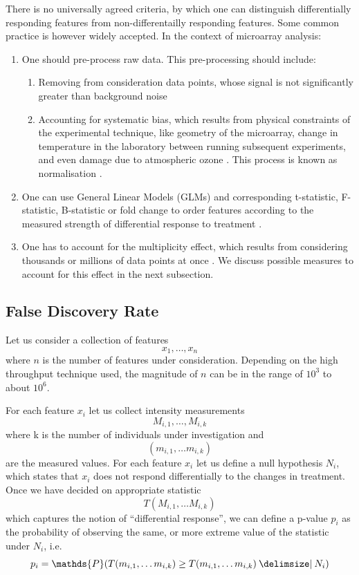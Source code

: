 There is no universally agreed criteria, by which one can distinguish differentially responding features from non-differentailly responding features. Some common practice is however widely accepted. In the context of microarray analysis:
\begin{enumerate}
    \item One should pre-process raw data. This pre-processing should include:
    \begin{enumerate}
        \item Removing from consideration data points, whose signal is not significantly greater than background noise \parencite{Smyth2004}
        \item Accounting for systematic bias, which results from physical constraints of the experimental technique, like geometry of the microarray, change in temperature in the laboratory between running subsequent experiments, and even damage due to atmospheric ozone \parencite{Fare2003}. This process is known as normalisation \parencite{Wit2004}.
    \end{enumerate}
    \item One can use General Linear Models (GLMs) and corresponding t-statistic, F-statistic, B-statistic or fold change to order features according to the measured strength of differential response to treatment \parencite{Smyth2004}.
    \item One has to account for the multiplicity effect, which results from considering thousands or millions of data points at once \parencite{Wit2004}. We discuss possible measures to account for this effect in the next subsection.
\end{enumerate}

\subsection{False Discovery Rate} \label{FDR}

Let us consider a collection of features $$x_{1}, \ldots, x_{n}$$ where $n$ is the number of features under consideration. Depending on the high throughput technique used, the magnitude of $n$ can be in the range of $10^{3}$ to about $10^{6}$.

For each feature $x_{i}$ let us collect intensity measurements $$M_{i,1}, \ldots, M_{i,k}$$ where k is the number of individuals under investigation and $$(m_{i,1}, \ldots m_{i,k})$$ are the measured values. For each feature $x_{i}$ let us define a null hypothesis $N_{i}$, which states that $x_{i}$ does not respond differentially to the changes in treatment. Once we have decided on appropriate statistic $$T(M_{i,1}, \ldots M_{i,k})$$ which captures the notion of ``differential response'', we can define a p-value $p_{i}$ as the probability of observing the same, or more extreme value of the statistic under $N_{i}$, i.e.  $$p_{i}=\mathds{P}(T(m_{i,1}, \ldots m_{i,k}) \geq T(m_{i,1}, \ldots m_{i,k}) \given N_{i})$$

